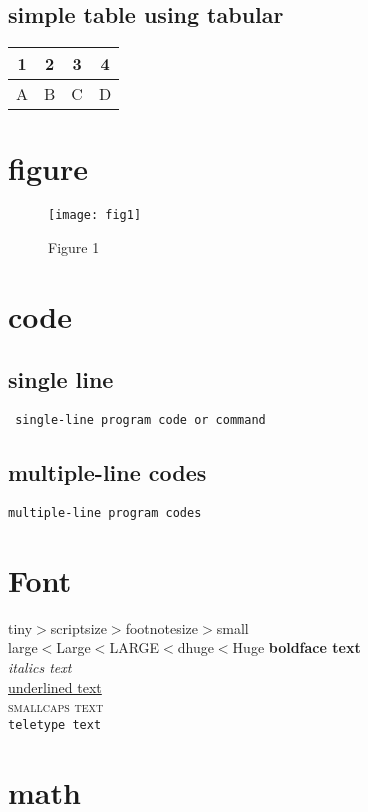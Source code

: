 \documentclass{article}
\begin{document}
\subsection{simple table using tabular}
\begin{tabular}{|c|c|c|c|} %
\hline
1&2&3&4\\
\hline
A&B&C&D\\
\hline
\end{tabular}

\section{figure}

\begin{figure}[!h]
\centering
\texttt{[image: fig1]}
\caption{Figure 1}
\end{figure}

\section{code}
\subsection{single line}
\verb| single-line program code or command |
\subsection{multiple-line codes}
\begin{verbatim}
multiple-line program codes
\end{verbatim}

\section{Font}
{\tiny tiny}$>${\scriptsize scriptsize}$>${\footnotesize footnotesize}$>${\small small}\\
{\large large}$<${\Large Large}$<${\LARGE LARGE}$<$d{\huge huge}$<${\Huge Huge}
\textbf{ boldface text }\\ 
\textit{ italics text } \\
\underline{ underlined text} \\
\textsc{smallcaps text}\\
\texttt{teletype text}\\

\section{math}
\end{document}
